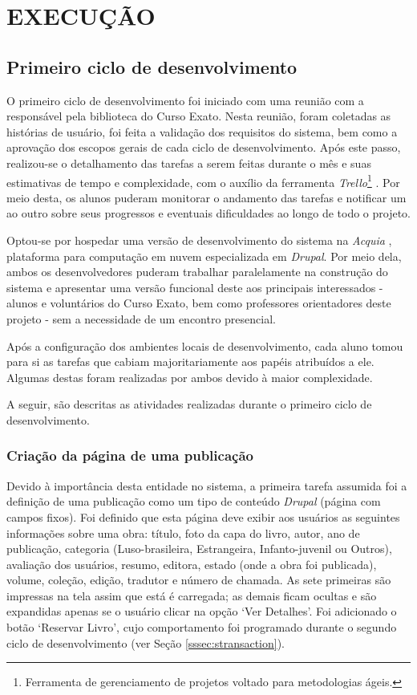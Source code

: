 \documentclass[a4paper]{article}
\begin{document}
\pagebreak
\section{EXECUÇÃO}
\subsection{Primeiro ciclo de desenvolvimento}

O primeiro ciclo de desenvolvimento foi iniciado com uma reunião com a responsável pela biblioteca do Curso Exato. Nesta reunião, foram coletadas as histórias de usuário, foi feita a validação dos requisitos do sistema, bem como a aprovação dos escopos gerais de cada ciclo de desenvolvimento. Após este passo, realizou-se o detalhamento das tarefas a serem feitas durante o mês e suas estimativas de tempo e complexidade, com o auxílio da ferramenta \textit{Trello}\footnote{Ferramenta de gerenciamento de projetos voltado para metodologias ágeis.} \cite{trello}. Por meio desta, os alunos puderam monitorar o andamento das tarefas e notificar um ao outro sobre seus progressos e eventuais dificuldades ao longo de todo o projeto.

Optou-se por hospedar uma versão de desenvolvimento do sistema na \textit{Acquia} \cite{acquia}, plataforma para computação em nuvem especializada em \textit{Drupal}. Por meio dela, ambos os desenvolvedores puderam trabalhar paralelamente na construção do sistema e apresentar uma versão funcional deste aos principais interessados - alunos e voluntários do Curso Exato, bem como professores orientadores deste projeto - sem a necessidade de um encontro presencial.

Após a configuração dos ambientes locais de desenvolvimento, cada aluno tomou para si as tarefas que cabiam majoritariamente aos papéis atribuídos a ele. Algumas destas foram realizadas por ambos devido à maior complexidade.

A seguir, são descritas as atividades realizadas durante o primeiro ciclo de desenvolvimento.

\subsubsection{Criação da página de uma publicação}

Devido à importância desta entidade no sistema, a primeira tarefa assumida foi a definição de uma publicação como um tipo de conteúdo \textit{Drupal} (página com campos fixos). Foi definido que esta página deve exibir aos usuários as seguintes informações sobre uma obra: título, foto da capa do livro, autor, ano de publicação, categoria (Luso-brasileira, Estrangeira, Infanto-juvenil ou Outros), avaliação dos usuários, resumo, editora, estado (onde a obra foi publicada), volume, coleção, edição, tradutor e número de chamada. As sete primeiras são impressas na tela assim que está é carregada; as demais ficam ocultas e são expandidas apenas se o usuário clicar na opção ‘Ver Detalhes’. Foi adicionado o botão ‘Reservar Livro’, cujo comportamento foi programado durante  o segundo ciclo de desenvolvimento (ver Seção {\ref{sssec:stransaction}}).
\end{document}
